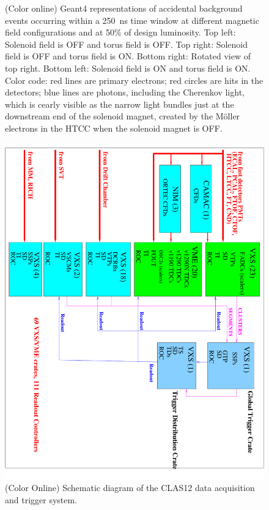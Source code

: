 \documentclass[final,3p,twocolumn]{elsarticle}
\begin{document}
\begin{figure}[htbp!]
{}
\caption{(Color online) Geant4 representations of accidental background events occurring within a 250~ns time window at
  different magnetic field configurations and at 50\% of design luminosity. Top left: Solenoid field is OFF and
  torus field is OFF. Top right: Solenoid field is OFF and torus field is ON. Bottom right: Rotated view of top right.
  Bottom left: Solenoid field is ON and torus field is ON. Color code: red lines are
  primary electrons; red circles are hits in the detectors; blue lines are photons, including the Cherenkov light, 
  which is cearly visible as the narrow light bundles just at the downstream end of the solenoid magnet, created by the 
  M\"oller electrons in the HTCC when the solenoid magnet is OFF.  }
  
\label{gemc-event}
\end{figure}

\begin{figure}[htbp!]
\centerline{\includegraphics[angle=90,width=1.5\columnwidth]{clas12-daq-1.pdf}}
\caption{(Color Online) Schematic diagram of the CLAS12 data acquisition and trigger system.}
\label{daq}
\end{figure}
\end{document}
